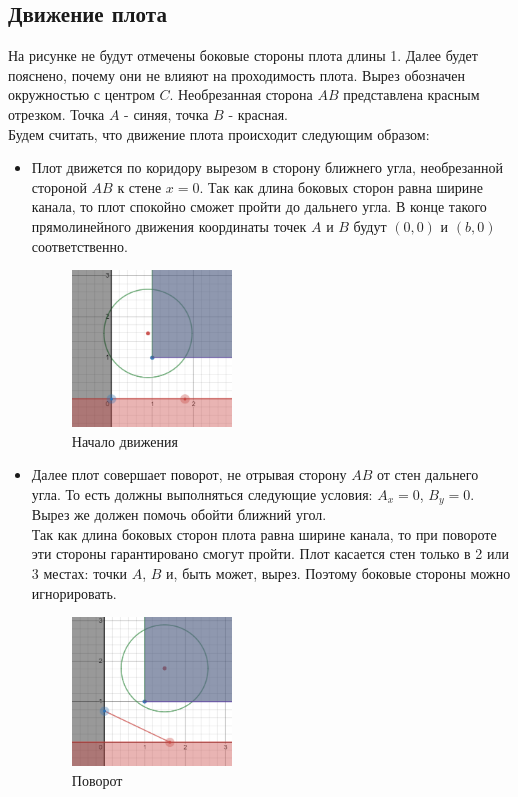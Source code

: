 \subsection{Движение плота}
На рисунке не будут отмечены боковые стороны плота длины 1. Далее будет пояснено, почему они не влияют на проходимость плота. Вырез обозначен окружностью с центром $C$. Необрезанная сторона $AB$ представлена красным отрезком. Точка $A$ - синяя, точка $B$ - красная.\\

Будем считать, что движение плота происходит следующим образом:
\begin{itemize}
\item Плот движется по коридору вырезом в сторону ближнего угла, необрезанной стороной $AB$ к стене $x=0$. Так как длина боковых сторон равна ширине канала, то плот спокойно сможет пройти до дальнего угла. В конце такого прямолинейного движения координаты точек $A$ и $B$ будут $(0,0)$ и $(b,0)$ соответственно.
\begin{figure}[!htb]
    \centering
    \includegraphics[width=0.4\textwidth]{fig/sofa1.png}
    \caption{Начало движения}
\end{figure}

\newpage

\item Далее плот совершает поворот, не отрывая сторону $AB$ от стен дальнего угла. То есть должны выполняться следующие условия: $A_x=0$, $B_y=0$. Вырез же должен помочь обойти ближний угол. \\
Так как длина боковых сторон плота равна ширине канала, то при повороте эти стороны гарантировано смогут пройти. Плот касается стен только в 2 или 3 местах: точки $A$, $B$ и, быть может, вырез. Поэтому боковые стороны можно игнорировать.
\begin{figure}[!htb]
    \centering
    \includegraphics[width=0.4\textwidth]{fig/sofa2.png}
    \caption{Поворот}
\end{figure}


\end{itemize}
